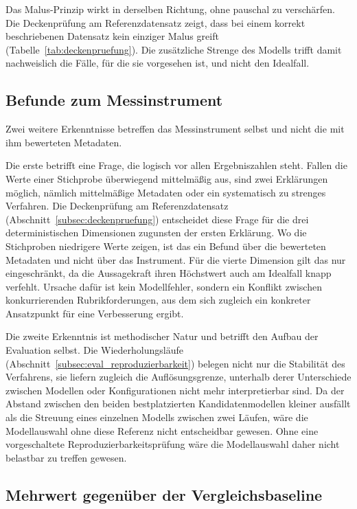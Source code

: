 Das Malus-Prinzip wirkt in derselben Richtung, ohne pauschal zu verschärfen. Die
Deckenprüfung am Referenzdatensatz zeigt, dass bei einem korrekt beschriebenen
Datensatz kein einziger Malus greift (Tabelle~\ref{tab:deckenpruefung}). Die
zusätzliche Strenge des Modells trifft damit nachweislich die Fälle, für die sie
vorgesehen ist, und nicht den Idealfall.

\subsection{Befunde zum Messinstrument}
\label{subsec:eval_messinstrument}

Zwei weitere Erkenntnisse betreffen das Messinstrument selbst und nicht die mit
ihm bewerteten Metadaten.

Die erste betrifft eine Frage, die logisch vor allen Ergebniszahlen steht. Fallen
die Werte einer Stichprobe überwiegend mittelmäßig aus, sind zwei Erklärungen
möglich, nämlich mittelmäßige Metadaten oder ein systematisch zu strenges
Verfahren. Die Deckenprüfung am Referenzdatensatz
(Abschnitt~\ref{subsec:deckenpruefung}) entscheidet diese Frage für die drei
deterministischen Dimensionen zugunsten der ersten Erklärung. Wo die Stichproben
niedrigere Werte zeigen, ist das ein Befund über die bewerteten Metadaten und
nicht über das Instrument. Für die vierte Dimension gilt das nur eingeschränkt,
da die Aussagekraft ihren Höchstwert auch am Idealfall knapp verfehlt. Ursache dafür ist kein Modellfehler, sondern ein Konflikt zwischen konkurrierenden
Rubrikforderungen, aus dem sich zugleich ein konkreter Ansatzpunkt für eine
Verbesserung ergibt.

Die zweite Erkenntnis ist methodischer Natur und betrifft den Aufbau der
Evaluation selbst. Die Wiederholungsläufe
(Abschnitt~\ref{subsec:eval_reproduzierbarkeit}) belegen nicht nur die Stabilität
des Verfahrens, sie liefern zugleich die Auflösungsgrenze, unterhalb derer
Unterschiede zwischen Modellen oder Konfigurationen nicht mehr interpretierbar
sind. Da der Abstand zwischen den beiden bestplatzierten Kandidatenmodellen
kleiner ausfällt als die Streuung eines einzelnen Modells zwischen zwei Läufen,
wäre die Modellauswahl ohne diese Referenz nicht entscheidbar gewesen. Ohne eine vorgeschaltete Reproduzierbarkeitsprüfung wäre die Modellauswahl daher
nicht belastbar zu treffen gewesen.

\subsection{Mehrwert gegenüber der Vergleichsbaseline}
\label{subsec:eval_mehrwert}

